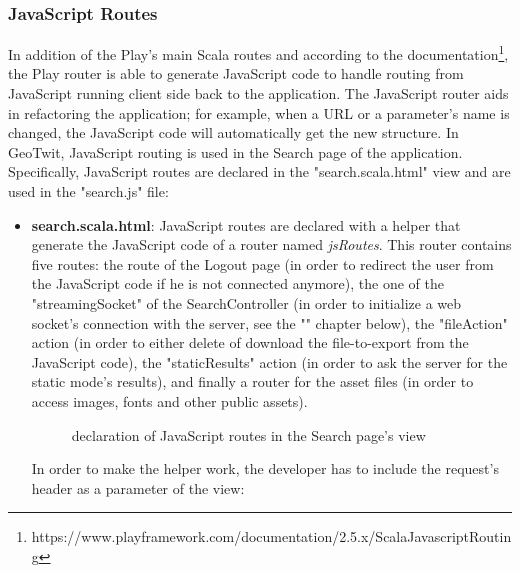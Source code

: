 \documentclass[a4paper,11pt]{report}
\begin{document}
\subsubsection{JavaScript Routes}
In addition of the Play's main Scala routes and according to the documentation\footnote{https://www.playframework.com/documentation/2.5.x/ScalaJavascriptRouting}, the Play router is able to generate JavaScript code to handle routing from JavaScript running client side back to the application. The JavaScript router aids in refactoring the application; for example, when a URL or a parameter's name is changed, the JavaScript code will automatically get the new structure.
In GeoTwit, JavaScript routing is used in the Search page of the application. Specifically, JavaScript routes are declared in the "search.scala.html" view and are used in the "search.js" file:
\begin{itemize}
	\item \textbf{search.scala.html}: JavaScript routes are declared with a helper that generate the JavaScript code of a router named \emph{jsRoutes}. This router contains five routes: the route of the Logout page (in order to redirect the user from the JavaScript code if he is not connected anymore), the one of the "streamingSocket" of the SearchController (in order to initialize a web socket's connection with the server, see the "" chapter below), the "fileAction" action (in order to either delete of download the file-to-export from the JavaScript code), the "staticResults" action (in order to ask the server for the static mode's results), and finally a router for the asset files (in order to access images, fonts and other public assets).
	\begin{figure}[H]
	\vspace{-5pt}
	\begin{center}
	\vspace{-5pt}
	\caption{declaration of JavaScript routes in the Search page's view}
	\end{center}
	\end{figure}
	In order to make the helper work, the developer has to include the request's header as a parameter of the view:

\end{itemize}
\end{document}
